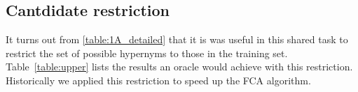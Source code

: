 \documentclass[11pt,a4paper]{article}
\begin{document}




\subsection{Cantdidate restriction}

It turns out from \autoref{table:1A_detailed} that it is was useful in this
shared task to restrict the set of possible hypernyms to those in the training
set.  Table~\ref{table:upper} lists the results an oracle would achieve with
this restriction. Historically we applied this restriction to speed up the FCA
algorithm.

\begin{table}
	\centering
  \caption{Results of an oracle restricted to the training hypernyms.}
	\label{table:upper}
\end{table}




\end{document}
